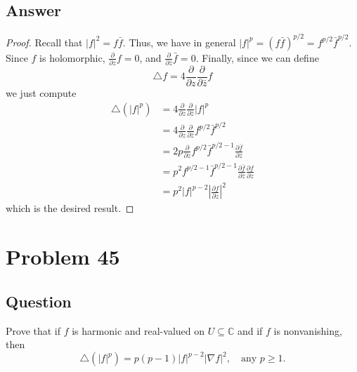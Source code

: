 \documentclass[11pt]{article}
\begin{document}
\subsection{Answer}
\begin{proof}
Recall that $|f|^2 = f \bar f$. Thus, we have in general $|f|^p = (f \bar f) ^ {p/2} = f^{p/2} \bar{f}^{p/2}$. Since $f$ is holomorphic, $\frac{\partial}{\partial z} f = 0$, and $\frac{\partial}{\partial\bar z} \bar f = 0$.  Finally, since we can define 
\[\triangle f = 4 \frac{\partial}{\partial z} \frac{\partial}{\partial \bar z} f \]
we just compute
\begin{align*}
\triangle ( |f| ^p ) &= 4 \frac{\partial}{\partial z} \frac{\partial}{\partial \bar z} |f|^p \\ 
&= 4 \frac{\partial}{\partial z} \frac{\partial}{\partial \bar z} f^{p/2} \bar{f}^{p/2} \\ 
&= 2  p \frac{\partial}{\partial z}  f^{p/2} \bar{f}^{p/2 - 1} \frac{\partial \bar f}{ \partial \bar z} \\ 
&=  p^2   f^{p/2 -1 } \bar{f}^{p/2 - 1} \frac{\partial \bar f}{ \partial \bar z}  \frac{\partial f }{ \partial z}\\ 
&=  p^2   |f|^{p-2} \left|\frac{\partial f }{ \partial z}\right|^2
\end{align*}
which is the desired result.
\end{proof}

\section{Problem  45}
\subsection{Question}
Prove that if $f$ is harmonic and real-valued on $U \subseteq \mathbb{C}$ and if $f$ is nonvanishing, then
\[\triangle(|f|^p) = p(p-1)|f|^{p-2}|\nabla f|^2, \quad\mbox{any }p \geq 1.\]
\end{document}
